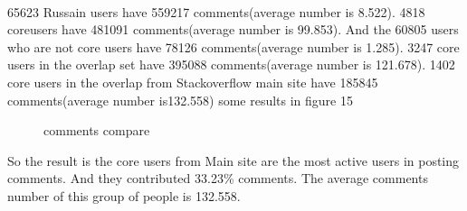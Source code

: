 \documentclass[A4paper,twoside,twocolumn]{article}
\begin{document}
\\65623 Russain users have 559217 comments(average number is 8.522).
 4818 coreusers have 481091 comments(average number is 99.853). And the 60805 users who are not core users have 78126 comments(average number is 1.285).
3247 core users in the overlap set have 395088 comments(average number is 121.678).
1402 core users in the overlap from Stackoverflow main site have 185845 comments(average number is132.558)
some results in figure 15
 \begin{figure}[H]
 		\centering 
	\caption{comments compare}
	\label{fig} 

  	\end{figure}
So the result is the core users from Main site are the most active users in posting comments. And they contributed 33.23\% comments. The average comments number of this group of people is 132.558.
\end{document}
